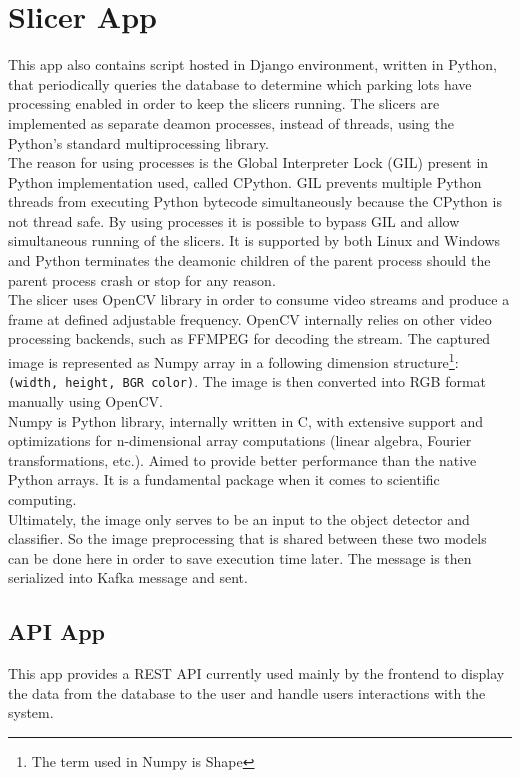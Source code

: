 \documentclass[thesis=M,english]{FITthesis}[2019/03/06]
\begin{document}
\section{Slicer App}
This app also contains script hosted in Django environment, written in Python, that periodically queries the database to determine which parking lots have processing enabled in order to keep the slicers running. The slicers are implemented as separate deamon processes, instead of threads, using the Python's standard multiprocessing library.\\

The reason for using processes is the Global Interpreter Lock (GIL) present in Python implementation used, called CPython. GIL prevents multiple Python threads from executing Python bytecode simultaneously because the CPython is not thread safe. By using processes it is possible to bypass GIL and allow simultaneous running of the slicers. It is supported by both Linux and Windows and Python terminates the deamonic children of the parent process should the parent process crash or stop for any reason.\\

The slicer uses OpenCV library in order to consume video streams and produce a frame at defined adjustable frequency. OpenCV internally relies on other video processing backends, such as FFMPEG for decoding the stream. The captured image is represented as Numpy array in a following dimension structure\footnote{The term used in Numpy is Shape}: \texttt{(width, height, BGR color)}. The image is then converted into RGB format manually using OpenCV.  \\

Numpy is Python library, internally written in C, with extensive support and optimizations for n-dimensional array computations (linear algebra, Fourier transformations, etc.). Aimed to provide better performance than the native Python arrays. It is a fundamental package when it comes to scientific computing.\\



Ultimately, the image only serves to be an input to the object detector and classifier. So the image preprocessing that is shared between these two models can be done here in order to save execution time later. The message is then serialized into Kafka message and sent.\\

\subsection{API App}
This app provides a REST API currently used mainly by the frontend to display the data from the database to the user and handle users interactions with the system.\\
\end{document}
